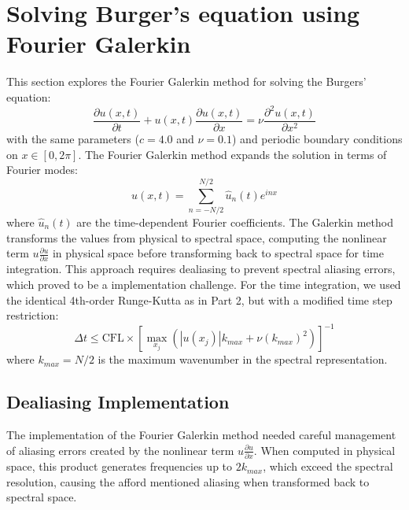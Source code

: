 \section{Solving Burger's equation using Fourier Galerkin}
This section explores the Fourier Galerkin method for solving the Burgers' equation:
\begin{equation}
	\frac{\partial u(x, t)}{\partial t} + u(x, t) \frac{\partial u(x, t)}{\partial x} = \nu \frac{\partial^2 u(x, t)}{\partial x^2}
\end{equation}
with the same parameters ($c = 4.0$ and $\nu = 0.1$) and periodic boundary conditions on $x \in [0, 2\pi]$.
%
The Fourier Galerkin method expands the solution in terms of Fourier modes:
\begin{equation}
	u(x, t) = \sum_{n=-N/2}^{N/2} \hat{u}_n(t)e^{inx}
\end{equation}
where $\hat{u}_n(t)$ are the time-dependent Fourier coefficients.
The Galerkin method transforms the values from physical to spectral space, computing the nonlinear term $u\frac{\partial u}{\partial x}$ in physical space before transforming back to spectral space for time integration. This approach requires dealiasing to prevent spectral aliasing errors, which proved to be a implementation challenge.
For the time integration, we used the identical 4th-order Runge-Kutta as in Part 2, but with a modified time step restriction:
\begin{equation}
	\Delta t \leq \text{CFL} \times \left[ \max_{x_j} \left(|u(x_j)| k_{max} + \nu (k_{max})^2  \right)\right]^{-1}
\end{equation}
where $k_{max} = N/2$ is the maximum wavenumber in the spectral representation.

\subsection{Dealiasing Implementation}
The implementation of the Fourier Galerkin method needed careful management of aliasing errors created by the nonlinear term $u\frac{\partial u}{\partial x}$. When computed in physical space, this product generates frequencies up to $2k_{max}$, which exceed the spectral resolution, causing the afford mentioned aliasing when transformed back to spectral space.

